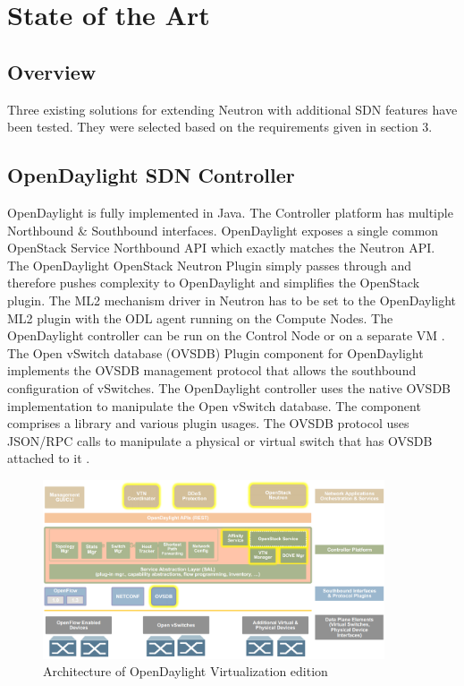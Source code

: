 \chapter{State of the Art}

\section{Overview}

Three existing solutions for extending Neutron with additional SDN features have been tested. They were selected based on the requirements given in section 3.

\section{OpenDaylight SDN Controller}


OpenDaylight is fully implemented in Java. The Controller platform has multiple Northbound \& Southbound interfaces. OpenDaylight exposes a single common OpenStack Service Northbound API which exactly matches the Neutron API. The OpenDaylight OpenStack Neutron Plugin simply passes through and therefore pushes complexity to OpenDaylight and simplifies the OpenStack plugin. The ML2 mechanism driver in Neutron has to be set to the OpenDaylight ML2 plugin with the ODL agent running on the Compute Nodes. The OpenDaylight controller can be run on the Control Node or on a separate VM \cite{odl-intro}. The Open vSwitch database (OVSDB) Plugin component for OpenDaylight implements the OVSDB management protocol that allows the southbound configuration of vSwitches. The OpenDaylight controller uses the native OVSDB implementation to manipulate the Open vSwitch database. The component comprises a library and various plugin usages. The OVSDB protocol uses JSON/RPC calls to manipulate a physical or virtual switch that has OVSDB attached to it \cite{odl-ovsdb}.

\begin{figure}[H]
\centering
\includegraphics[width=0.9\textwidth]{images/sota/odl_architecture.png}
\caption{Architecture of OpenDaylight Virtualization edition}
\end{figure}

